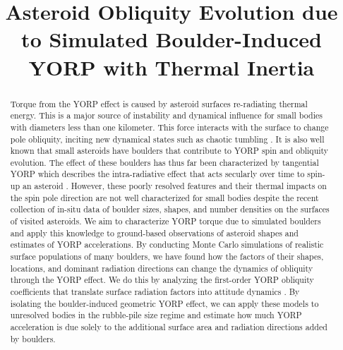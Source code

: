 \documentclass[12pt,notitlepage]{article}
\begin{document}
\title{Asteroid Obliquity Evolution due to Simulated Boulder-Induced YORP with Thermal Inertia}


\maketitle

\begin{abstract} 
    Torque from the YORP effect is caused by asteroid surfaces re-radiating thermal energy. This is a major source of instability and dynamical influence for small bodies with diameters less than one kilometer. This force interacts with the surface to change pole obliquity, inciting new dynamical states such as chaotic tumbling \cite{Breiter2015}. It is also well known that small asteroids have boulders that contribute to YORP spin and obliquity evolution. The effect of these boulders has thus far been characterized by tangential YORP which describes the intra-radiative effect that acts secularly over time to spin-up an asteroid \cite{Golubov2012}. However, these poorly resolved features and their thermal impacts on the spin pole direction are not well characterized for small bodies despite the recent collection of in-situ data of boulder sizes, shapes, and number densities on the surfaces of visited asteroids. We aim to characterize YORP torque due to simulated boulders and apply this knowledge to ground-based observations of asteroid shapes and estimates of YORP accelerations. By conducting Monte Carlo simulations of realistic surface populations of many boulders, we have found how the factors of their shapes, locations, and dominant radiation directions can change the dynamics of obliquity through the YORP effect. We do this by analyzing the first-order YORP obliquity coefficients that translate surface radiation factors into attitude dynamics \cite{Scheeres2007}. By isolating the boulder-induced geometric YORP effect, we can apply these models to unresolved bodies in the rubble-pile size regime and estimate how much YORP acceleration is due solely to the additional surface area and radiation directions added by boulders.

\end{abstract}

\linenumbers
\end{document}
